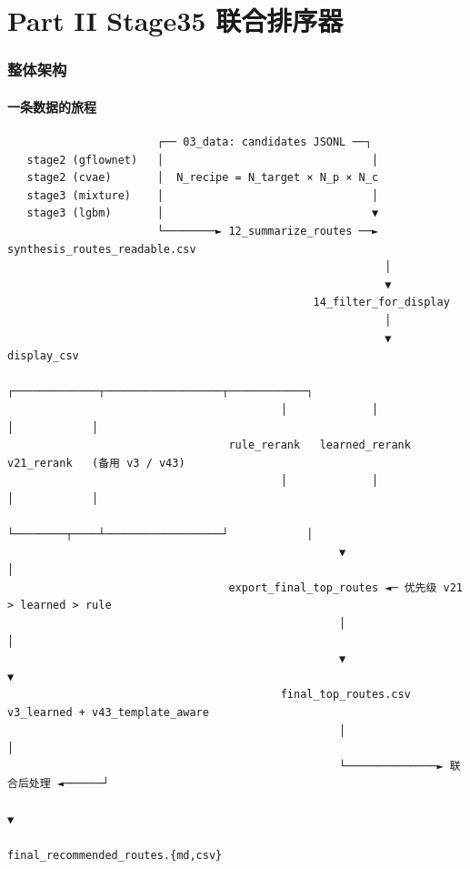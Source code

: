 \part*{Part II \quad Stage35 联合排序器}

\setcounter{section}{0}

\section{整体架构}

\subsection{一条数据的旅程}

\begin{lstlisting}
                       ┌── 03_data: candidates JSONL ──┐
   stage2 (gflownet)   │                                │
   stage2 (cvae)       │  N_recipe = N_target × N_p × N_c
   stage3 (mixture)    │                                │
   stage3 (lgbm)       │                                ▼
                       └────────► 12_summarize_routes ──► synthesis_routes_readable.csv
                                                          │
                                                          ▼
                                               14_filter_for_display
                                                          │
                                                          ▼  display_csv
                                          ┌─────────────┬──────────────────┬────────────┐
                                          │             │                  │            │
                                  rule_rerank   learned_rerank      v21_rerank   (备用 v3 / v43)
                                          │             │                  │            │
                                          └────────┬────┴──────────────────┘            │
                                                   ▼                                    │
                                  export_final_top_routes ◄─ 优先级 v21 > learned > rule
                                                   │                                    │
                                                   ▼                                    ▼
                                          final_top_routes.csv   v3_learned + v43_template_aware
                                                   │                                    │
                                                   └──────────────► 联合后处理 ◄──────┘
                                                                          ▼
                                                              final_recommended_routes.{md,csv}
\end{lstlisting}

